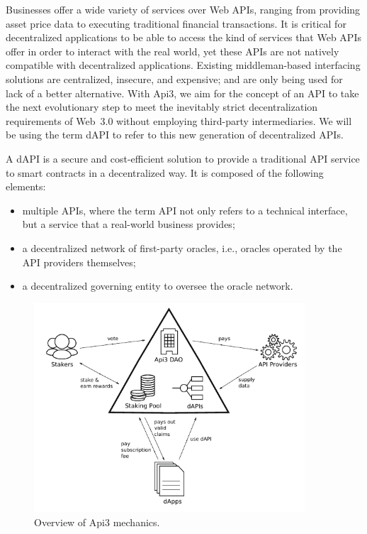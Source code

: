 \documentclass[11pt]{article}
\begin{document}
Businesses offer a wide variety of services over Web APIs, ranging from providing asset price data to executing traditional financial transactions.
It is critical for decentralized applications to be able to access the kind of services that Web APIs offer in order to interact with the real world, yet these APIs are not natively compatible with decentralized applications.
Existing middleman-based interfacing solutions are centralized, insecure, and expensive; and are only being used for lack of a better alternative.
With Api3, we aim for the concept of an API to take the next evolutionary step to meet the inevitably strict decentralization requirements of Web~3.0 without employing third-party intermediaries.
We will be using the term dAPI to refer to this new generation of decentralized APIs.

A dAPI is a secure and cost-efficient solution to provide a traditional API service to smart contracts in a decentralized way.
It is composed of the following elements:
\begin{itemize}
    \item multiple APIs, where the term API not only refers to a technical interface, but a service that a real-world business provides;
    \item a decentralized network of first-party oracles, i.e., oracles operated by the API providers themselves;
    \item a decentralized governing entity to oversee the oracle network.
\end{itemize}

\begin{figure}[!t]
    \centering
    \includegraphics[width=0.9\textwidth]{fig/teaser/teaser}
	\caption{Overview of Api3 mechanics.}
	\label{fig:teaser}
\end{figure}
\end{document}
